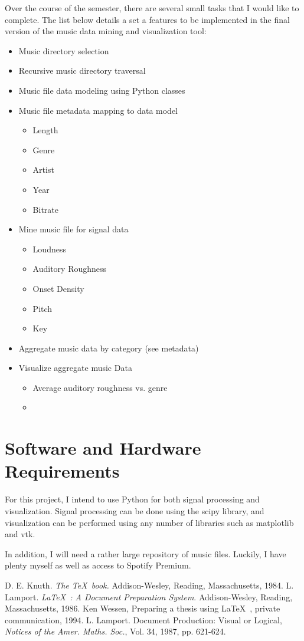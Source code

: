 \documentclass[12pt, a4paper]{article}
\begin{document}
Over the course of the semester, there are several small tasks that I would like
to complete. The list below details a set a features to be implemented in the
final version of the music data mining and visualization tool:

\begin{itemize}
  \item Music directory selection
  \item Recursive music directory traversal
  \item Music file data modeling using Python classes
  \item Music file metadata mapping to data model
  \begin{itemize}
    \item Length
    \item Genre
    \item Artist
    \item Year
    \item Bitrate
  \end{itemize}
  \item Mine music file for signal data
  \begin{itemize}
    \item Loudness
    \item Auditory Roughness
    \item Onset Density
    \item Pitch
    \item Key
  \end{itemize}
  \item Aggregate music data by category (see metadata)
  \item Visualize aggregate music Data
  \begin{itemize}
    \item Average auditory roughness vs. genre
    \item
  \end{itemize}
\end{itemize}

\section*{Software and Hardware Requirements}

For this project, I intend to use Python for both signal processing and
visualization. Signal processing can be done using the scipy library, and
visualization can be performed using any number of libraries such as
matplotlib and vtk.

In addition, I will need a rather large repository of music files. Luckily,
I have plenty myself as well as access to Spotify Premium.

\begin{thebibliography}{9}
 D. E. Knuth. {\em The \TeX~book.}\/ Addison-Wesley,
Reading, Massachusetts, 1984.
 L. Lamport. {\em \LaTeX~: A Document Preparation
System}.\/ Addison-Wesley, Reading, Massachusetts, 1986.
 Ken Wessen, Preparing a thesis using \LaTeX~, private
communication, 1994.
 L. Lamport. Document Production: Visual
or Logical, {\em Notices of the Amer. Maths. Soc.},\/ Vol. 34,
1987, pp. 621-624.
\end{thebibliography}
\end{document}
